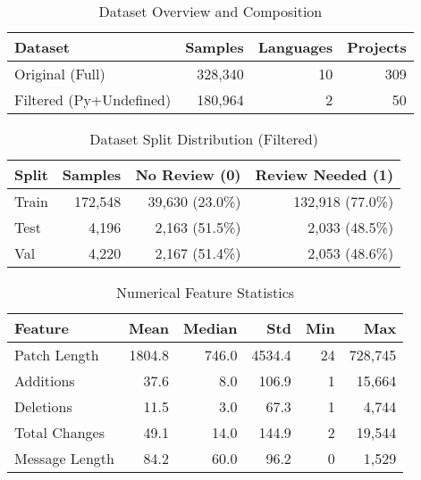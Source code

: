 
\begin{table}[h]
\centering
\caption{Dataset Overview and Composition}
\label{tab:dataset_overview}
\begin{tabular}{|l|r|r|r|}
\hline
\textbf{Dataset} & \textbf{Samples} & \textbf{Languages} & \textbf{Projects} \\
\hline
Original (Full) & 328,340 & 10 & 309 \\
Filtered (Py+Undefined) & 180,964 & 2 & 50 \\
\hline
\end{tabular}
\end{table}


\begin{table}[h]
\centering
\caption{Dataset Split Distribution (Filtered)}
\label{tab:split_distribution}
\begin{tabular}{|l|r|r|r|}
\hline
\textbf{Split} & \textbf{Samples} & \textbf{No Review (0)} & \textbf{Review Needed (1)} \\
\hline
Train & 172,548 & 39,630 (23.0\%) & 132,918 (77.0\%) \\
Test & 4,196 & 2,163 (51.5\%) & 2,033 (48.5\%) \\
Val & 4,220 & 2,167 (51.4\%) & 2,053 (48.6\%) \\
\hline
\end{tabular}
\end{table}


\begin{table}[h]
\centering
\caption{Numerical Feature Statistics}
\label{tab:feature_stats}
\begin{tabular}{|l|r|r|r|r|r|}
\hline
\textbf{Feature} & \textbf{Mean} & \textbf{Median} & \textbf{Std} & \textbf{Min} & \textbf{Max} \\
\hline
Patch Length & 1804.8 & 746.0 & 4534.4 & 24 & 728,745 \\
Additions & 37.6 & 8.0 & 106.9 & 1 & 15,664 \\
Deletions & 11.5 & 3.0 & 67.3 & 1 & 4,744 \\
Total Changes & 49.1 & 14.0 & 144.9 & 2 & 19,544 \\
Message Length & 84.2 & 60.0 & 96.2 & 0 & 1,529 \\
\hline
\end{tabular}
\end{table}

